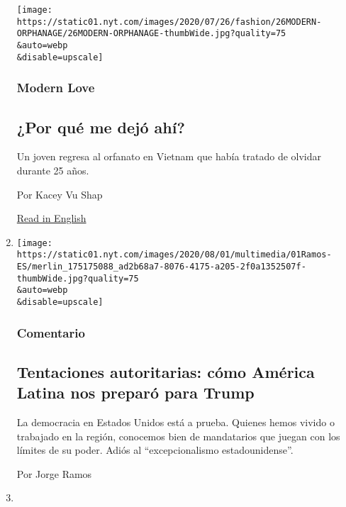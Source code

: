 \begin{enumerate}
  \texttt{[image: https://static01.nyt.com/images/2020/07/26/fashion/26MODERN-ORPHANAGE/26MODERN-ORPHANAGE-thumbWide.jpg?quality=75\\\&auto=webp\\\&disable=upscale]}

  \hypertarget{modern-love}{%
  \subsubsection{Modern Love}\label{modern-love}}

  \hypertarget{por-quuxe9-me-dejuxf3-ahuxed}{%
  \subsection{¿Por qué me dejó
  ahí?}\label{por-quuxe9-me-dejuxf3-ahuxed}}

  Un joven regresa al orfanato en Vietnam que había tratado de olvidar
  durante 25 años.

  Por Kacey Vu Shap

  \href{https://www.nytimes.com/2020/07/24/style/modern-love-adoption-vietnam-why-did-she-leave-me-there.html}{Read
  in English}
\item
  \href{/es/2020/08/01/espanol/opinion/trump-autoritarismo.html}{}

  \texttt{[image: https://static01.nyt.com/images/2020/08/01/multimedia/01Ramos-ES/merlin\_175175088\_ad2b68a7-8076-4175-a205-2f0a1352507f-thumbWide.jpg?quality=75\\\&auto=webp\\\&disable=upscale]}

  \hypertarget{comentario-1}{%
  \subsubsection{Comentario}\label{comentario-1}}

  \hypertarget{tentaciones-autoritarias-cuxf3mo-amuxe9rica-latina-nos-preparuxf3-para-trump}{%
  \subsection{Tentaciones autoritarias: cómo América Latina nos preparó
  para
  Trump}\label{tentaciones-autoritarias-cuxf3mo-amuxe9rica-latina-nos-preparuxf3-para-trump}}

  La democracia en Estados Unidos está a prueba. Quienes hemos vivido o
  trabajado en la región, conocemos bien de mandatarios que juegan con
  los límites de su poder. Adiós al ``excepcionalismo estadounidense''.

  Por Jorge Ramos
\item
  \href{/es/2020/07/31/espanol/negocios/argentina-deuda.html}{}


\end{enumerate}
